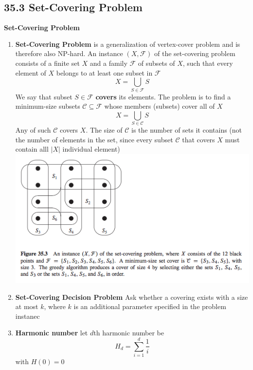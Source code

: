 \documentclass[11pt]{article}
\begin{document}
\subsection*{35.3 Set-Covering Problem}


\begin{defn*}
    \textbf{Set-Covering Problem} 
    \begin{enumerate}
        \item \textbf{Set-Covering Problem} is a generalization of vertex-cover problem and is therefore also NP-hard. An instance $(X, \mathcal{F})$ of the set-covering problem consists of a finite set $X$ and a family $\mathcal{F}$ of subsets of $X$, such that every element of $X$ belongs to at least one subset in $\mathcal{F}$
        \[
            X = \bigcup_{S\in \mathcal{F}} S
        \]
        We say that subset $S\in \mathcal{F}$ \textbf{covers} its elements. The problem is to find a minimum-size subsets $\mathcal{C} \subseteq \mathcal{F}$ whose members (subsets) cover all of $X$ 
        \[
            X = \bigcup_{S\in \mathcal{C}} S
        \]
        Any of such $\mathcal{C}$ covers $X$. The size of $\mathcal{C}$ is the number of sets it contains (not the number of elements in the set, since every subset $\mathcal{C}$ that covers $X$ must contain alll $|X|$ individual element)\\
        \includegraphics[width=\textwidth]{set_cover.png}
        \item \textbf{Set-Covering Decision Problem} Ask whether a covering exists with a size at most $k$, where $k$ is an additional parameter specified in the problem instanec
        \item \textbf{Harmonic number} let $d$th harmonic number be 
        \[
            H_d = \sum_{i=1}^d \frac{1}{i}
        \]
        with $H(0) = 0$
    \end{enumerate}
\end{defn*}
\end{document}
